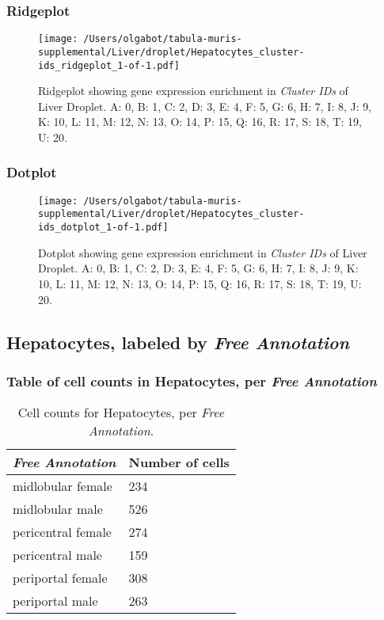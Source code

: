 \clearpage

\subsubsection{Ridgeplot}
\begin{figure}[h]
\centering
\texttt{[image: /Users/olgabot/tabula-muris-supplemental/Liver/droplet/Hepatocytes\_cluster-ids\_ridgeplot\_1-of-1.pdf]}

\caption{ Ridgeplot  showing gene expression enrichment in \emph{Cluster IDs} of Liver Droplet. A: 0, B: 1, C: 2, D: 3, E: 4, F: 5, G: 6, H: 7, I: 8, J: 9, K: 10, L: 11, M: 12, N: 13, O: 14, P: 15, Q: 16, R: 17, S: 18, T: 19, U: 20.}
\end{figure}


\clearpage

\subsubsection{Dotplot}
\begin{figure}[h]
\centering
\texttt{[image: /Users/olgabot/tabula-muris-supplemental/Liver/droplet/Hepatocytes\_cluster-ids\_dotplot\_1-of-1.pdf]}

\caption{ Dotplot  showing gene expression enrichment in \emph{Cluster IDs} of Liver Droplet. A: 0, B: 1, C: 2, D: 3, E: 4, F: 5, G: 6, H: 7, I: 8, J: 9, K: 10, L: 11, M: 12, N: 13, O: 14, P: 15, Q: 16, R: 17, S: 18, T: 19, U: 20.}
\end{figure}


\clearpage

\subsection{Hepatocytes, labeled by \emph{Free Annotation}}
\subsubsection{Table of cell counts in Hepatocytes, per \emph{Free Annotation}}\begin{table}[h]
\centering
\label{my-label}
\begin{tabular}{@{}ll@{}}
\toprule

\emph{Free Annotation}& Number of cells \\ \midrule
midlobular female & 234 \\

midlobular male & 526 \\

pericentral female & 274 \\

pericentral male & 159 \\

periportal female & 308 \\

periportal male & 263 \\
\bottomrule
\end{tabular}
\caption{Cell counts for Hepatocytes, per \emph{Free Annotation}.}
\end{table}

